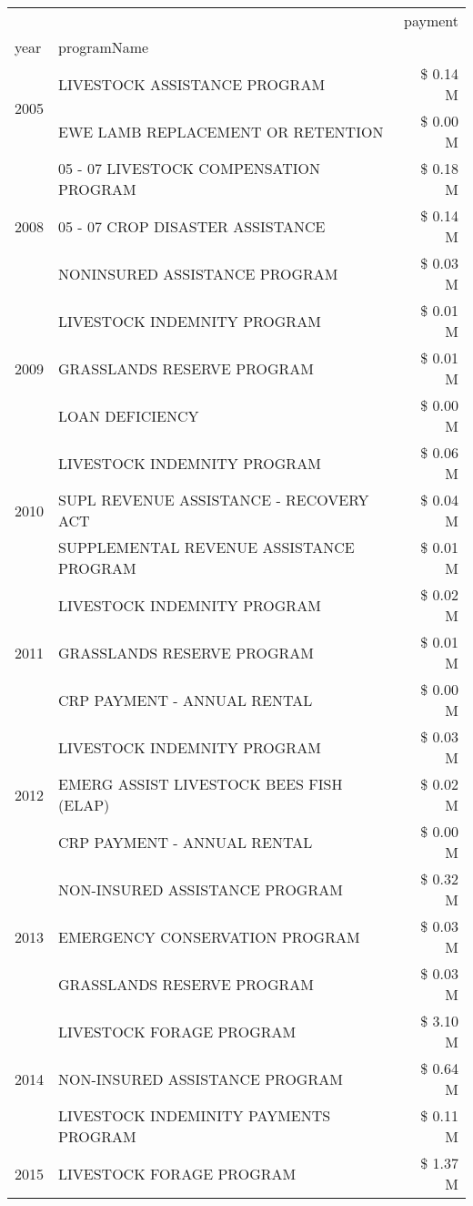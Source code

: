 \begin{tabular}{llr}
\toprule
 &  & payment \\
year & programName &  \\
\midrule
\multirow[t]{2}{*}{2005} & LIVESTOCK ASSISTANCE PROGRAM & \$ 0.14 M \\
 & EWE LAMB REPLACEMENT OR RETENTION & \$ 0.00 M \\
\cline{1-3}
\multirow[t]{3}{*}{2008} & 05 - 07 LIVESTOCK COMPENSATION PROGRAM & \$ 0.18 M \\
 & 05 - 07 CROP DISASTER ASSISTANCE & \$ 0.14 M \\
 & NONINSURED ASSISTANCE PROGRAM & \$ 0.03 M \\
\cline{1-3}
\multirow[t]{3}{*}{2009} & LIVESTOCK INDEMNITY PROGRAM & \$ 0.01 M \\
 & GRASSLANDS RESERVE PROGRAM & \$ 0.01 M \\
 & LOAN DEFICIENCY & \$ 0.00 M \\
\cline{1-3}
\multirow[t]{3}{*}{2010} & LIVESTOCK INDEMNITY PROGRAM & \$ 0.06 M \\
 & SUPL REVENUE ASSISTANCE - RECOVERY ACT & \$ 0.04 M \\
 & SUPPLEMENTAL REVENUE ASSISTANCE PROGRAM & \$ 0.01 M \\
\cline{1-3}
\multirow[t]{3}{*}{2011} & LIVESTOCK INDEMNITY PROGRAM & \$ 0.02 M \\
 & GRASSLANDS RESERVE PROGRAM & \$ 0.01 M \\
 & CRP PAYMENT - ANNUAL RENTAL & \$ 0.00 M \\
\cline{1-3}
\multirow[t]{3}{*}{2012} & LIVESTOCK INDEMNITY PROGRAM & \$ 0.03 M \\
 & EMERG ASSIST LIVESTOCK BEES FISH (ELAP) & \$ 0.02 M \\
 & CRP PAYMENT - ANNUAL RENTAL & \$ 0.00 M \\
\cline{1-3}
\multirow[t]{3}{*}{2013} & NON-INSURED ASSISTANCE PROGRAM & \$ 0.32 M \\
 & EMERGENCY CONSERVATION PROGRAM & \$ 0.03 M \\
 & GRASSLANDS RESERVE PROGRAM & \$ 0.03 M \\
\cline{1-3}
\multirow[t]{3}{*}{2014} & LIVESTOCK FORAGE PROGRAM & \$ 3.10 M \\
 & NON-INSURED ASSISTANCE PROGRAM & \$ 0.64 M \\
 & LIVESTOCK INDEMINITY PAYMENTS PROGRAM & \$ 0.11 M \\
\cline{1-3}
\multirow[t]{3}{*}{2015} & LIVESTOCK FORAGE PROGRAM & \$ 1.37 M \\

\end{tabular}
